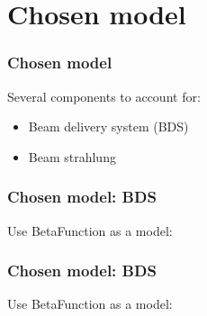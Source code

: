 \documentclass{beamer}
\begin{document}
\section{Chosen model}
\begin{frame}
\frametitle{Chosen model}
Several components to account for:
\begin{itemize}
  \item Beam delivery system (BDS)
  \item Beam strahlung
\end{itemize}
\end{frame}

\begin{frame}
\frametitle{Chosen model: BDS}
Use BetaFunction as a model:\\
\end{frame}

\begin{frame}
\frametitle{Chosen model: BDS}
Use BetaFunction as a model:\\

\end{frame}
\end{document}
